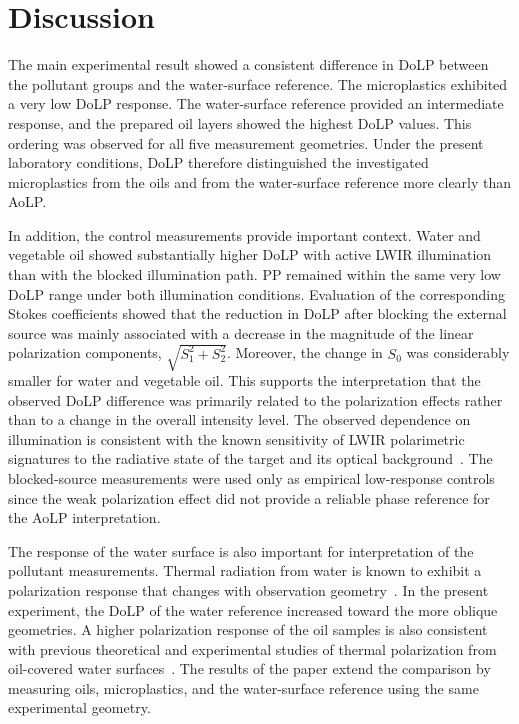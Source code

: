 \documentclass[pdflatex,sn-apa]{sn-jnl}
\begin{document}

\section{Discussion}

The main experimental result showed a consistent difference in DoLP between the pollutant groups and the water-surface reference. The microplastics exhibited a very low DoLP response. The water-surface reference provided an intermediate response, and the prepared oil layers showed the highest DoLP values. This ordering was observed for all five measurement geometries. Under the present laboratory conditions, DoLP therefore distinguished the investigated microplastics from the oils and from the water-surface reference more clearly than AoLP.

In addition, the control measurements provide important context. Water and vegetable oil showed substantially higher DoLP with active LWIR illumination than with the blocked illumination path. PP remained within the same very low DoLP range under both illumination conditions. 
Evaluation of the corresponding Stokes coefficients showed that the reduction in DoLP after blocking the external source was mainly associated with a decrease in the magnitude of the linear polarization components, $\sqrt{S_1^2+S_2^2}$. Moreover, the change in $S_0$ was considerably smaller for water and vegetable oil. This supports the interpretation that the observed DoLP difference was primarily related to the polarization effects rather than to a change in the overall intensity level.
The observed dependence on illumination is consistent with the known sensitivity of LWIR polarimetric signatures to the radiative state of the target and its optical background~\citep{Tyo2007}. The blocked-source measurements were used only as empirical low-response controls since the weak polarization effect did not provide a reliable phase reference for the AoLP interpretation.

The response of the water surface is also important for interpretation of the pollutant measurements. Thermal radiation from water is known to exhibit a polarization response that changes with observation geometry~\citep{Shaw1999,Shaw2001}. In the present experiment, the DoLP of the water reference increased toward the more oblique geometries. A higher polarization response of the oil samples is also consistent with previous theoretical and experimental studies of thermal polarization from oil-covered water surfaces~\citep{Zhang2014,Chenault2018,Fu2022,Sun2023}. The results of the paper extend the comparison by measuring oils, microplastics, and the water-surface reference using the same experimental geometry.
\end{document}

